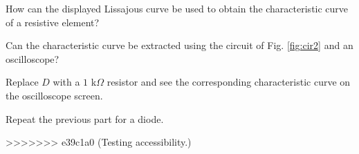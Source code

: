 \documentclass[11pt]{article}
\begin{document}
\begin{question}
    \begin{subquestion}{How can the displayed Lissajous curve be used
            to obtain the characteristic curve of a resistive element?}
        \answer{}
    \end{subquestion}

    \begin{subquestion}{Can the characteristic curve be extracted using the circuit of Fig. \ref{fig:cir2} and an oscilloscope? }
        \answer{}
    \end{subquestion}

    \begin{subquestion}{Replace $D$ with a $1$ k$\Omega$ resistor and see the corresponding characteristic curve on the oscilloscope screen.}
        \answer{}
    \end{subquestion}

    \begin{subquestion}{Repeat the previous part for a diode.}
        \answer{}
    \end{subquestion}
>>>>>>> e39c1a0 (Testing accessibility.)


\end{question}

\end{document}
